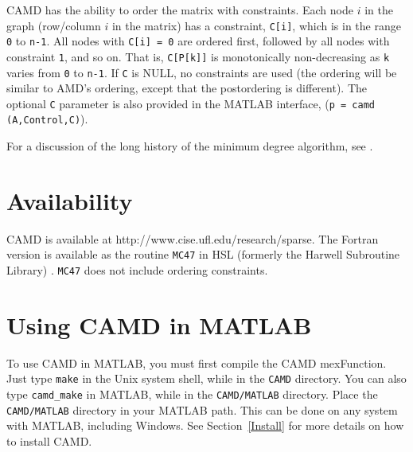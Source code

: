 \documentclass[11pt]{article}
\begin{document}
CAMD has the ability to order the matrix with constraints.  Each
node $i$ in the graph (row/column $i$ in the matrix) has a constraint,
{\tt C[i]}, which is in the range {\tt 0} to {\tt n-1}.  All nodes with
{\tt C[i] = 0} are
ordered first, followed by all nodes with constraint {\tt 1}, and so on.
That is, {\tt C[P[k]]} is monotonically non-decreasing as {\tt k} varies from
{\tt 0} to {\tt n-1}.  If {\tt C} is NULL, no
constraints are used (the ordering will be similar to AMD's ordering,
except that the postordering is different).
The optional {\tt C} parameter is also provided in the MATLAB interface,
({\tt p = camd (A,Control,C)}).

For a discussion of the long history of the minimum degree algorithm,
see \cite{GeorgeLiu89}.

\section{Availability}

CAMD is available at http://www.cise.ufl.edu/research/sparse.
The Fortran version is available as the routine {\tt MC47} in HSL
(formerly the Harwell Subroutine Library) \cite{hsl:2002}. {\tt MC47} does
not include ordering constraints.

\section{Using CAMD in MATLAB}

To use CAMD in MATLAB, you must first compile the CAMD mexFunction.
Just type {\tt make} in the Unix system shell, while in the {\tt CAMD}
directory.  You can also type {\tt camd\_make} in MATLAB, while in the
{\tt CAMD/MATLAB} directory.  Place the {\tt CAMD/MATLAB} directory in your
MATLAB path.  This can be done on any system with MATLAB, including Windows.
See Section~\ref{Install} for more details on how to install CAMD.
\end{document}
